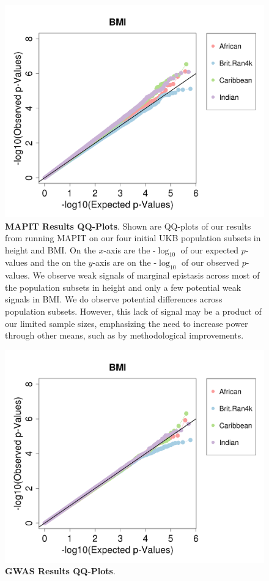 \documentclass[12pt, a4paper]{article}
\begin{document}
\begin{figure}[htbp]
\centering
\includegraphics[scale=.35]{Images/Supp/InterPath_Supp_Figure_MAPIT_vs3_BMI.png}
\caption[TBD]{\textbf{MAPIT Results QQ-Plots}. Shown are QQ-plots of our results from running MAPIT on our four initial UKB population subsets in height and BMI. On the $x$-axis are the -$\log_{10}$ of our expected $p$-values and the on the $y$-axis are on the -$\log_{10}$ of our observed $p$-values. We observe weak signals of marginal epistasis across most of the population subsets in height and only a few potential weak signals in BMI. We do observe potential differences across population subsets. However, this lack of signal may be a product of our limited sample sizes, emphasizing the need to increase power through other means, such as by methodological improvements.}
\label{InterPath-Supp-Figure-MAPIT-BMI}
\end{figure}
\clearpage

\begin{figure}[htbp]
\centering
\includegraphics[scale=.35]{Images/Supp/InterPath_Supp_Figure_GWAS_vs2_BMI.png}
\caption[TBD]{\textbf{GWAS Results QQ-Plots}.}
\label{InterPath-Supp-Figure-GWAS-BMI}
\end{figure}
\clearpage
\end{document}
